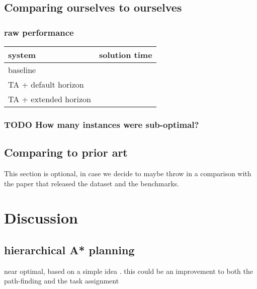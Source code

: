 \subsection{Comparing ourselves to ourselves}
\label{sec:orgeb8fb7a}
\subsubsection{raw performance}
\label{sec:orgd8b7d8f}
\begin{center}
\begin{tabular}{ll}
system & solution time\\
\hline
baseline & \\
TA + default horizon & \\
TA + extended horizon & \\
\end{tabular}
\end{center}
\subsubsection{{\bfseries\sffamily TODO} How many instances were sub-optimal?}
\label{sec:org3319ecb}

\subsection{Comparing to prior art}
\label{sec:org30a1bdf}
This section is optional, in case we decide to maybe throw in a comparison with the paper that released the dataset and the benchmarks.
\section{Discussion}
\label{sec:orgf926c93}
\subsection{hierarchical A* planning}
\label{sec:orgb6f722a}
near optimal, based on a simple idea \cite{botea2004near}.
this could be an improvement to both the path-finding and the task assignment

